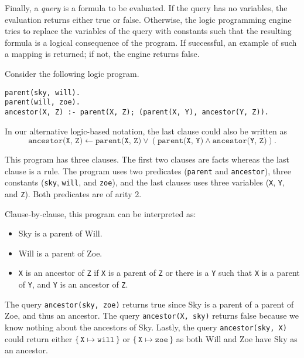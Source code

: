Finally, a \emph{query} is a formula to be evaluated. If the query has no variables, the evaluation returns either true or false. Otherwise, the logic programming engine tries to replace the variables of the query with constants such that the resulting formula is a logical consequence of the program. If successful, an example of such a mapping is returned; if not, the engine returns false.

\begin{example}
  Consider the following logic program.
\begin{verbatim}
parent(sky, will).
parent(will, zoe).
ancestor(X, Z) :- parent(X, Z); (parent(X, Y), ancestor(Y, Z)).
\end{verbatim}
In our alternative logic-based notation, the last clause could also be written as
\[
\texttt{ancestor(X, Z)} \gets \texttt{parent(X, Z)} \lor (\texttt{parent(X, Y)} \land \texttt{ancestor(Y, Z)}).
\]

This program has three clauses. The first two clauses are facts whereas the last clause is a rule. The program uses two predicates (\texttt{parent} and \texttt{ancestor}), three constants (\texttt{sky}, \texttt{will}, and \texttt{zoe}), and the last clauses uses three variables (\texttt{X}, \texttt{Y}, and \texttt{Z}). Both predicates are of arity 2.

Clause-by-clause, this program can be interpreted as:
\begin{itemize}
\item Sky is a parent of Will.
\item Will is a parent of Zoe.
\item \texttt{X} is an ancestor of \texttt{Z} if \texttt{X} is a parent of \texttt{Z} or there is a \texttt{Y} such that \texttt{X} is a parent of \texttt{Y}, and \texttt{Y} is an ancestor of \texttt{Z}.
\end{itemize}

The query \texttt{ancestor(sky, zoe)} returns true since Sky is a parent of a parent of Zoe, and thus an ancestor. The query \texttt{ancestor(X, sky)} returns false because we know nothing about the ancestors of Sky. Lastly, the query \texttt{ancestor(sky, X)} could return either $\{\, \texttt{X} \mapsto \texttt{will} \,\}$ or $\{\, \texttt{X} \mapsto \texttt{zoe} \,\}$ as both Will and Zoe have Sky as an ancestor.
\end{example}

